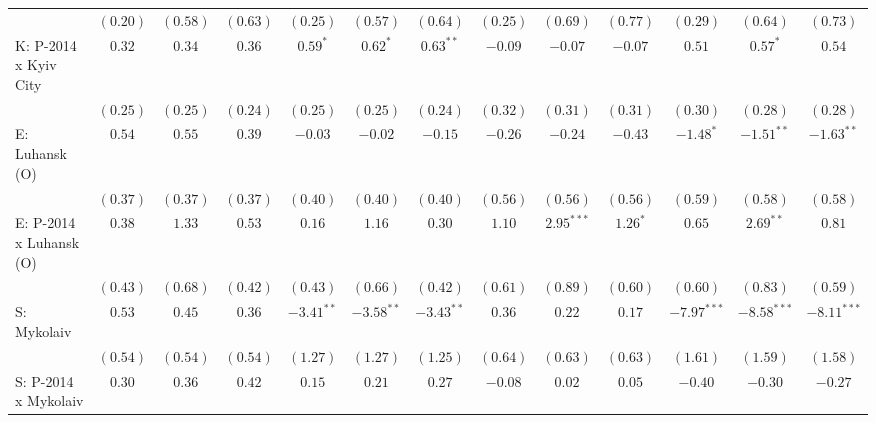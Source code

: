 \begin{table}
\begin{center}
\begin{tiny}
\begin{tabular}{l c c c c c c c c c c c c}
                            & $(0.20)$      & $(0.58)$      & $(0.63)$       & $(0.25)$      & $(0.57)$      & $(0.64)$      & $(0.25)$      & $(0.69)$       & $(0.77)$       & $(0.29)$       & $(0.64)$       & $(0.73)$       \\
K: P-2014 x Kyiv City       & $0.32$        & $0.34$        & $0.36$         & $0.59^{*}$    & $0.62^{*}$    & $0.63^{**}$   & $-0.09$       & $-0.07$        & $-0.07$        & $0.51$         & $0.57^{*}$     & $0.54$         \\
                            & $(0.25)$      & $(0.25)$      & $(0.24)$       & $(0.25)$      & $(0.25)$      & $(0.24)$      & $(0.32)$      & $(0.31)$       & $(0.31)$       & $(0.30)$       & $(0.28)$       & $(0.28)$       \\
E: Luhansk (O)              & $0.54$        & $0.55$        & $0.39$         & $-0.03$       & $-0.02$       & $-0.15$       & $-0.26$       & $-0.24$        & $-0.43$        & $-1.48^{*}$    & $-1.51^{**}$   & $-1.63^{**}$   \\
                            & $(0.37)$      & $(0.37)$      & $(0.37)$       & $(0.40)$      & $(0.40)$      & $(0.40)$      & $(0.56)$      & $(0.56)$       & $(0.56)$       & $(0.59)$       & $(0.58)$       & $(0.58)$       \\
E: P-2014 x Luhansk (O)     & $0.38$        & $1.33$        & $0.53$         & $0.16$        & $1.16$        & $0.30$        & $1.10$        & $2.95^{***}$   & $1.26^{*}$     & $0.65$         & $2.69^{**}$    & $0.81$         \\
                            & $(0.43)$      & $(0.68)$      & $(0.42)$       & $(0.43)$      & $(0.66)$      & $(0.42)$      & $(0.61)$      & $(0.89)$       & $(0.60)$       & $(0.60)$       & $(0.83)$       & $(0.59)$       \\
S: Mykolaiv                 & $0.53$        & $0.45$        & $0.36$         & $-3.41^{**}$  & $-3.58^{**}$  & $-3.43^{**}$  & $0.36$        & $0.22$         & $0.17$         & $-7.97^{***}$  & $-8.58^{***}$  & $-8.11^{***}$  \\
                            & $(0.54)$      & $(0.54)$      & $(0.54)$       & $(1.27)$      & $(1.27)$      & $(1.25)$      & $(0.64)$      & $(0.63)$       & $(0.63)$       & $(1.61)$       & $(1.59)$       & $(1.58)$       \\
S: P-2014 x Mykolaiv        & $0.30$        & $0.36$        & $0.42$         & $0.15$        & $0.21$        & $0.27$        & $-0.08$       & $0.02$         & $0.05$         & $-0.40$        & $-0.30$        & $-0.27$        \\

\end{tabular}
\end{tiny}
\end{center}
\end{table}
